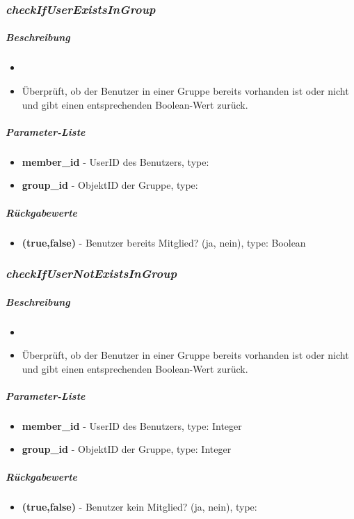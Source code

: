 \subsubsection*{\textit{checkIfUserExistsInGroup}}\label{checkIfUserExistsInGroupMGUI}
\subparagraph{Beschreibung}
\begin{itemize}
	\item[] \noindent{} 
	\item[] Überprüft, ob der Benutzer in einer Gruppe bereits vorhanden ist oder nicht und gibt einen entsprechenden Boolean-Wert zurück.
\end{itemize}
\subparagraph{Parameter-Liste}
\begin{itemize}
	\item[] \textbf{member\_id} - UserID des Benutzers, type: 
	\item[] \textbf{group\_id} - ObjektID der Gruppe, type: 
\end{itemize}
\subparagraph{Rückgabewerte}
\begin{itemize}
	\item[] \textbf{(true,false)} - Benutzer bereits Mitglied? (ja, nein), type: Boolean
\end{itemize}

\subsubsection*{\textit{checkIfUserNotExistsInGroup}}\label{checkIfUserNotExistsInGroupMGUI}
\subparagraph{Beschreibung}
\begin{itemize}
	\item[] \noindent{} 
	\item[] Überprüft, ob der Benutzer in einer Gruppe bereits vorhanden ist oder nicht und gibt einen entsprechenden Boolean-Wert zurück.
\end{itemize}
\subparagraph{Parameter-Liste}
\begin{itemize}
	\item[] \textbf{member\_id} - UserID des Benutzers, type: Integer
	\item[] \textbf{group\_id} - ObjektID der Gruppe, type: Integer
\end{itemize}
\subparagraph{Rückgabewerte}
\begin{itemize}
	\item[] \textbf{(true,false)} - Benutzer kein Mitglied? (ja, nein), type:
\end{itemize}

